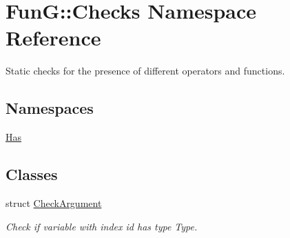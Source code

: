 \hypertarget{namespaceFunG_1_1Checks}{}\section{FunG\+:\+:Checks Namespace Reference}
\label{namespaceFunG_1_1Checks}


Static checks for the presence of different operators and functions.  


\subsection*{Namespaces}
\begin{DoxyCompactItemize}
\item 
 \hyperlink{namespaceFunG_1_1Checks_1_1Has}{Has}
\end{DoxyCompactItemize}
\subsection*{Classes}
\begin{DoxyCompactItemize}
\item 
struct \hyperlink{structFunG_1_1Checks_1_1CheckArgument}{Check\+Argument}
\begin{DoxyCompactList}\small\item\em Check if variable with index id has type Type. \end{DoxyCompactList}\end{DoxyCompactItemize}
